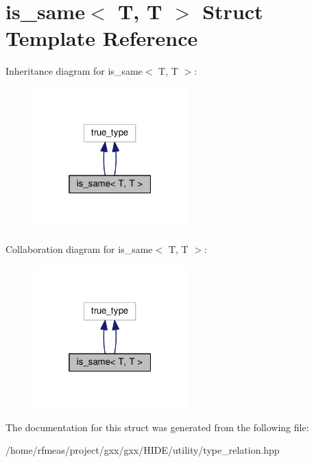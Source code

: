 \hypertarget{structis__same_3_01T_00_01T_01_4}{}\section{is\+\_\+same$<$ T, T $>$ Struct Template Reference}
\label{structis__same_3_01T_00_01T_01_4}


Inheritance diagram for is\+\_\+same$<$ T, T $>$\+:
\nopagebreak
\begin{figure}[H]
\begin{center}
\leavevmode
\includegraphics[width=169pt]{structis__same_3_01T_00_01T_01_4__inherit__graph}
\end{center}
\end{figure}


Collaboration diagram for is\+\_\+same$<$ T, T $>$\+:
\nopagebreak
\begin{figure}[H]
\begin{center}
\leavevmode
\includegraphics[width=169pt]{structis__same_3_01T_00_01T_01_4__coll__graph}
\end{center}
\end{figure}


The documentation for this struct was generated from the following file\+:\begin{DoxyCompactItemize}
\item 
/home/rfmeas/project/gxx/gxx/\+H\+I\+D\+E/utility/type\+\_\+relation.\+hpp\end{DoxyCompactItemize}
